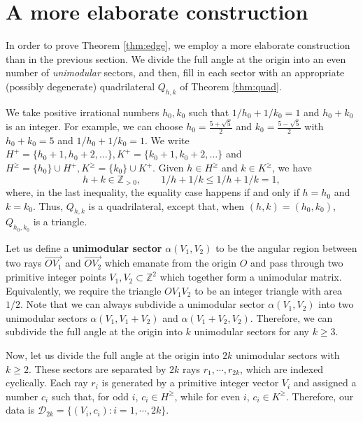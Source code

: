 \documentclass[a4paper]{article}
\begin{document}
\section{A more elaborate construction}
In order to prove Theorem \ref{thm:edge}, we employ a more elaborate construction than in the previous section. We divide the full angle at the origin into an even number of \textit{unimodular} sectors, and then, fill in each sector with an appropriate (possibly degenerate) quadrilateral $Q_{h,k}$ of Theorem \ref{thm:quad}.

We take positive irrational numbers $h_0,k_0$ such that $1/h_0 + 1/k_0 = 1$ and $h_0 + k_0$ is an integer. For example, we can choose $h_0 = \frac{5+\sqrt{5}}{2}$ and $k_0 = \frac{5-\sqrt{5}}{2}$ with $h_0 + k_0 = 5$ and $1/h_0 + 1/k_0 = 1$. We write $H^+ = \{h_0 + 1, h_0 + 2, \dots \}, K^+ = \{k_0 + 1, k_0 + 2, \dots \}$ and $H^\geq = \{h_0\} \cup H^+, K^\geq = \{k_0\} \cup K^+$. Given $h \in H^\geq$ and $k \in K^\geq$, we have
\begin{equation}
	h + k \in \mathbb{Z}_{>0}, \qquad 1/h + 1/k \leq 1/h + 1/k = 1,
\end{equation}
where, in the last inequality, the equality case happens if and only if $h = h_0$ and $k = k_0$. Thus, $Q_{h,k}$ is a quadrilateral, except that, when $(h,k) = (h_0,k_0)$, $Q_{h_0,k_0}$ is a triangle. 

Let us define a \textbf{unimodular sector} $\alpha(V_1, V_2)$ to be the angular region between two rays $\overrightarrow{OV_1}$ and $\overrightarrow{OV_2}$ which emanate from the origin $O$ and pass through two primitive integer points $V_1, V_2 \subset \mathbb{Z}^2$ which together form a unimodular matrix. Equivalently, we require the triangle $OV_1V_2$ to be an integer triangle with area $1/2$. Note that we can always subdivide a unimodular sector $\alpha(V_1, V_2)$ into two unimodular sectors $\alpha(V_1, V_1 + V_2)$ and $\alpha(V_1 + V_2, V_2)$. Therefore, we can subdivide the full angle at the origin into $k$ unimodular sectors for any $k \geq 3$. 

Now, let us divide the full angle at the origin into $2k$ unimodular sectors with $k \geq 2$. These sectors are separated by $2k$ rays $r_1, \cdots, r_{2k}$, which are indexed cyclically. Each ray $r_i$ is generated by a primitive integer vector $V_i$ and assigned a number $c_i$ such that, for odd $i$, $c_i \in H^\geq$, while for even $i$, $c_i \in K^\geq$. Therefore, our data is $\mathcal{D}_{2k} = \{(V_i, c_i): i = 1, \cdots, 2k\}$.
\end{document}
